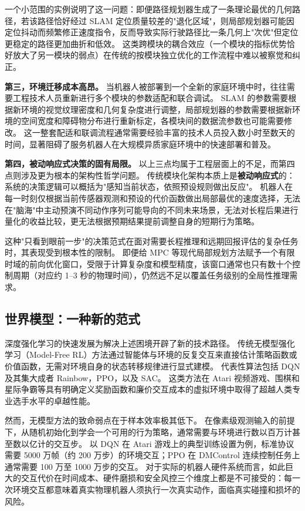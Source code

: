 \documentclass[12pt,a4paper]{ctexart}
\begin{document}
一个小范围的实例说明了这一问题：即便路径规划器生成了一条理论最优的几何路径，若该路径恰好经过 SLAM 定位质量较差的"退化区域"，则局部规划器可能因定位抖动而频繁修正速度指令，反而导致实际行驶路径比一条几何上"次优"但定位更稳定的路径更加曲折和低效。
这类跨模块的耦合效应（一个模块的指标优势恰好放大了另一模块的弱点）在传统的按模块独立优化的工作流程中难以被察觉和纠正。

\textbf{第三，环境迁移成本高昂。}
当机器人被部署到一个全新的家庭环境中时，往往需要工程技术人员重新进行多个模块的参数适配和联合调试。
SLAM 的参数需要根据新环境的视觉纹理密度和几何复杂度进行调整，局部规划器的参数需要根据新环境的空间宽度和障碍物分布进行重新标定，各模块间的数据流参数也可能需要修改。
这一整套配适和联调流程通常需要经验丰富的技术人员投入数小时至数天的时间，显著阻碍了服务机器人在大规模异质家庭环境中的快速部署和普及。

\textbf{第四，被动响应式决策的固有局限。}
以上三点均属于工程层面上的不足，而第四点则涉及更为根本的架构性哲学问题。
传统模块化架构本质上是\textbf{被动响应式}的：系统的决策逻辑可以概括为"感知当前状态，依照预设规则做出反应"。
机器人在每一时刻仅根据当前传感器观测和预设的代价函数做出局部最优的速度选择，无法在"脑海"中主动预演不同动作序列可能导向的不同未来场景，无法对长程后果进行量化的收益比较，更无法根据预期结果提前调整自身的短期行为策略。

这种"只看到眼前一步"的决策范式在面对需要长程推理和远期回报评估的复杂任务时，其表现受到根本性的限制。
即便给 MPC 等现代局部规划方法赋予一个有限时域的前向优化窗口，受限于计算复杂度和模型精度，该窗口通常也只有数十个控制周期（对应约 1--3 秒的物理时间），仍然远不足以覆盖任务级别的全局性推理需求。

\subsection{世界模型：一种新的范式}

深度强化学习的快速发展为解决上述困境开辟了新的技术路径。
传统无模型强化学习（Model-Free RL）方法通过智能体与环境的反复交互来直接估计策略函数或价值函数，无需对环境自身的状态转移规律进行显式建模。
代表性算法包括 DQN\cite{mnih2015human} 及其集大成者 Rainbow\cite{hessel2018rainbow}，PPO\cite{schulman2017proximal}，以及 SAC\cite{haarnoja2018soft}。
这类方法在 Atari 视频游戏、围棋和星际争霸等具有明确定义奖励函数和廉价交互成本的虚拟环境中取得了超越人类专业选手水平的卓越性能。

然而，无模型方法的致命弱点在于样本效率极其低下。
在像素级观测输入的前提下，从随机初始化到学会一个可用的行为策略，通常需要与环境进行数以百万计甚至数以亿计的交互步。
以 DQN 在 Atari 游戏上的典型训练设置为例，标准协议需要 5000 万帧（约 200 万步）的环境交互；PPO 在 DMControl 连续控制任务上通常需要 100 万至 1000 万步的交互。
对于实际的机器人硬件系统而言，如此巨大的交互代价在时间成本、硬件磨损和安全风控三个维度上都是不可接受的：每一次环境交互都意味着真实物理机器人须执行一次真实动作，面临真实碰撞和损坏的风险。
\end{document}
